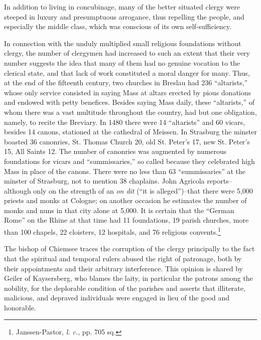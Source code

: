 In addition to living in concubinage, many of the better situated
clergy were steeped in luxury and presumptuous arrogance, thus repelling
the people, and especially the middle class, which was conscious
of its own self-sufficiency.

In connection with the unduly multiplied small religious foundations without
clergy, the number of clergymen had increased to
such an extent that their very number suggests the idea that many
of them had no genuine vocation to the clerical state, and that lack
of work constituted a moral danger for many. Thus, at the end
of the fifteenth century, two churches in Breslau had 236 “altarists,”
whose only service consisted in saying Mass at altars erected by pious
donations and endowed with petty benefices. Besides saying Mass
daily, these “altarists,” of whom there was a vast multitude throughout
the country, had but one obligation, namely, to recite the Breviary. In
1480 there were 14 “altarists” and 60 vicars, besides 14
canons, stationed at the cathedral of Meissen. In Strasburg the
minster boasted 36 canonries, St. Thomas Church 20, old St. Peter’s
17, new St. Peter’s 15, All Saints 12. The number of canonries was
augmented by numerous foundations for vicars and “summissaries,”
so called because they celebrated high Mass in place of the canons.
There were no less than 63 “summissaries” at the minster of
Strasburg, not to mention 38 chaplains. John Agricola reports--although only
on the strength of an \textit{on dit} (“it is alleged”)--that
there were 5,000 priests and monks at Cologne; on another occasion
he estimates the number of monks and nuns in that city alone at
5,000. It is certain that the “German Rome” on the Rhine at that time
had 11 foundations, 19 parish churches, more than 100 chapels, 22
cloisters, 12 hospitals, and 76 religious convents.\footnote{Janssen-Pastor, \textit{l. c.}, pp. 705 sq.}

The bishop of Chiemsee traces the corruption of the clergy principally
to the fact that the spiritual and temporal rulers abused the
right of patronage, both by their appointments and their arbitrary
interference. This opinion is shared by Geiler of Kaysersberg, who
blames the laity, in particular the patrons among the nobility, for
the deplorable condition of the parishes and asserts that illiterate,
malicious, and depraved individuals were engaged in lieu of the good
and honorable.

